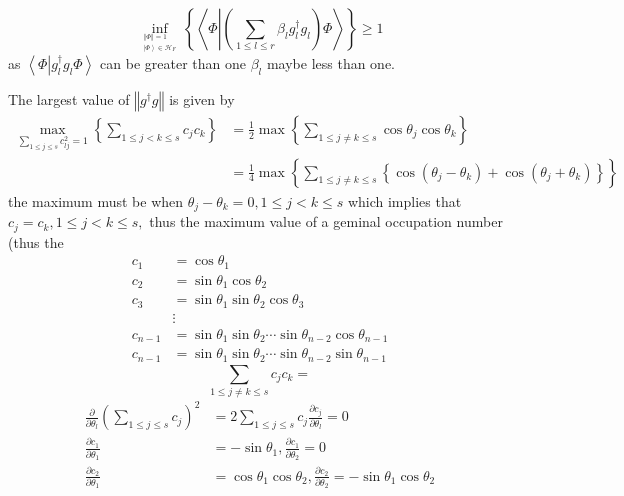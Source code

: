 \documentclass[aps,preprint]{revtex4}%
\begin{document}
\begin{equation}
\inf_{_{\substack{\left\Vert \Phi\right\Vert =1\\\left\vert \Phi\right\rangle
\in\mathcal{H}_{F}}}}\left\{  \left\langle \Phi\left\vert \left(  \sum_{1\leq
l\leq r}\beta_{l}g_{l}^{\dagger}g_{l}\right)  \right.  \Phi\right\rangle
\right\}  \geq1
\end{equation}
as $\left\langle \Phi\left\vert g_{l}^{\dagger}g_{l}\right.  \Phi\right\rangle
$ can be greater than one $\beta_{l}$ maybe less than one.

The largest value of $\left\Vert g^{\dagger}g\right\Vert $ is given by%
\begin{align}
\max_{\sum_{1\leq j\leq s}c_{lj}^{2}=1}\left\{  \sum_{1\leq j<k\leq s}%
c_{j}c_{k}\right\}   &  =\frac{1}{2}\max\left\{  \sum_{1\leq j\neq k\leq
s}\cos\theta_{j}\cos\theta_{k}\right\} \nonumber\\
&  =\frac{1}{4}\max\left\{  \sum_{1\leq j\neq k\leq s}\left\{  \cos\left(
\theta_{j}-\theta_{k}\right)  +\cos\left(  \theta_{j}+\theta_{k}\right)
\right\}  \right\}
\end{align}
the maximum must be when $\theta_{j}-\theta_{k}=0,1\leq j<k\leq s$ which
implies that $c_{j}=c_{k},1\leq j<k\leq s,$ thus the maximum value of a
geminal occupation number (thus the
\begin{align}
c_{1}  &  =\cos\theta_{1}\nonumber\\
c_{2}  &  =\sin\theta_{1}\cos\theta_{2}\nonumber\\
c_{3}  &  =\sin\theta_{1}\sin\theta_{2}\cos\theta_{3}\nonumber\\
&  \vdots\nonumber\\
c_{n-1}  &  =\sin\theta_{1}\sin\theta_{2}\cdots\sin\theta_{n-2}\cos
\theta_{n-1}\nonumber\\
c_{n-1}  &  =\sin\theta_{1}\sin\theta_{2}\cdots\sin\theta_{n-2}\sin
\theta_{n-1}%
\end{align}%
\begin{equation}
\sum_{1\leq j\neq k\leq s}c_{j}c_{k}=
\end{equation}%
\begin{align}
\frac{\partial}{\partial\theta_{l}}\left(  \sum_{1\leq j\leq s}c_{j}\right)
^{2}  &  =2\sum_{1\leq j\leq s}c_{j}\frac{\partial c_{j}}{\partial\theta_{l}%
}=0\nonumber\\
\frac{\partial c_{1}}{\partial\theta_{1}}  &  =-\sin\theta_{1},\frac{\partial
c_{1}}{\partial\theta_{2}}=0\nonumber\\
\frac{\partial c_{2}}{\partial\theta_{1}}  &  =\cos\theta_{1}\cos\theta
_{2},\frac{\partial c_{2}}{\partial\theta_{2}}=-\sin\theta_{1}\cos\theta_{2}%
\end{align}
\end{document}
